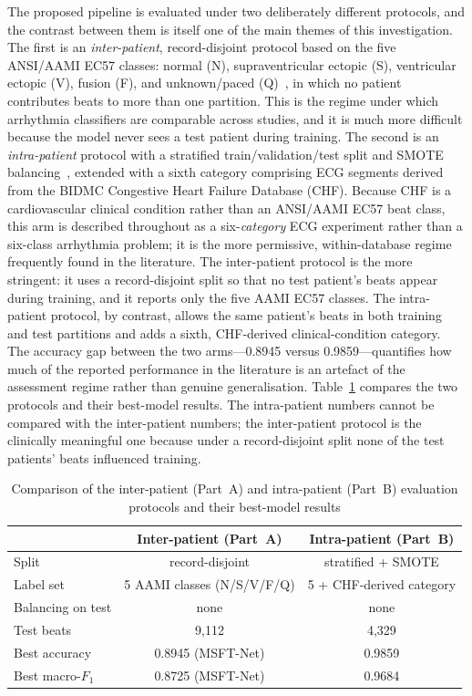 The proposed pipeline is evaluated under two deliberately different
protocols, and the contrast between them is itself one of the main themes of
this investigation. The first is an \emph{inter-patient}, record-disjoint
protocol based on the five ANSI/AAMI EC57 classes: normal (N),
supraventricular ectopic (S), ventricular ectopic (V), fusion (F), and
unknown/paced (Q)~\cite{aami_ec57_2012}, in which no patient contributes
beats to more than one partition. This is the regime under which arrhythmia
classifiers are comparable across studies, and it is much more difficult
because the model never sees a test patient during training. The second is
an \emph{intra-patient} protocol with a stratified train/validation/test
split and SMOTE balancing~\cite{chawla2002smote}, extended with a sixth
category comprising ECG segments derived from the BIDMC Congestive Heart
Failure Database (CHF). Because CHF is a cardiovascular clinical condition
rather than an ANSI/AAMI EC57 beat class, this arm is described throughout
as a six-\emph{category} ECG experiment rather than a six-class arrhythmia
problem; it is the more permissive, within-database regime frequently found
in the literature. The inter-patient protocol is the more stringent: it uses
a record-disjoint split so that no test patient's beats appear during
training, and it reports only the five AAMI EC57 classes. The intra-patient
protocol, by contrast, allows the same patient's beats in both training and
test partitions and adds a sixth, CHF-derived clinical-condition category.
The accuracy gap between the two arms---0.8945 versus 0.9859---quantifies
how much of the reported performance in the literature is an artefact of the
assessment regime rather than genuine generalisation.
Table~\ref{tab:protocols} compares the two protocols and their best-model
results. The intra-patient numbers cannot be compared with the inter-patient
numbers; the inter-patient protocol is the clinically meaningful one because
under a record-disjoint split none of the test patients' beats influenced
training.

\begin{table}[!t]
\centering
\caption{Comparison of the inter-patient (Part~A) and intra-patient (Part~B) evaluation protocols and their best-model results}
\label{tab:protocols}
\begin{tabular}{lcc}
\toprule
 & \textbf{Inter-patient (Part~A)} & \textbf{Intra-patient (Part~B)} \\
\midrule
Split                & record-disjoint          & stratified + SMOTE \\
Label set            & 5 AAMI classes (N/S/V/F/Q) & 5 + CHF-derived category \\
Balancing on test    & none                     & none \\
Test beats           & 9{,}112                  & 4{,}329 \\
Best accuracy        & 0.8945 (MSFT-Net)        & 0.9859 \\
Best macro-$F_1$     & 0.8725 (MSFT-Net)        & 0.9684 \\
\bottomrule
\end{tabular}
\end{table}

